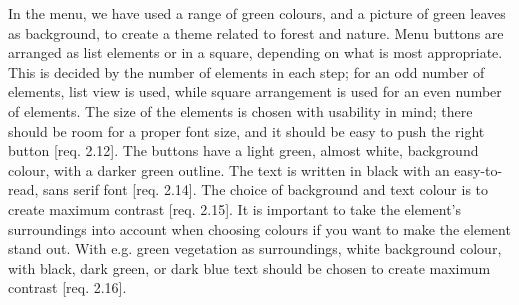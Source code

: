 In the menu, we have used a range of green colours, and a picture of green leaves as background, to create a theme related to forest and nature. Menu buttons are arranged as list elements or in a square, depending on what is most appropriate. This is decided by the number of elements in each step; for an odd number of elements, list view is used, while square arrangement is used for an even number of elements. The size of the elements is chosen with usability in mind; there should be room for a proper font size, and it should be easy to push the right button [req. 2.12]. The buttons have a light green, almost white, background colour, with a darker green outline. The text is written in black with an easy-to-read, sans serif font [req. 2.14]. The choice of background and text colour is to create maximum contrast [req. 2.15]. It is important to take the element's surroundings into account when choosing colours if you want to make the element stand out. With e.g. green vegetation as surroundings, white background colour, with black, dark green, or dark blue text should be chosen to create maximum contrast [req. 2.16]. 

